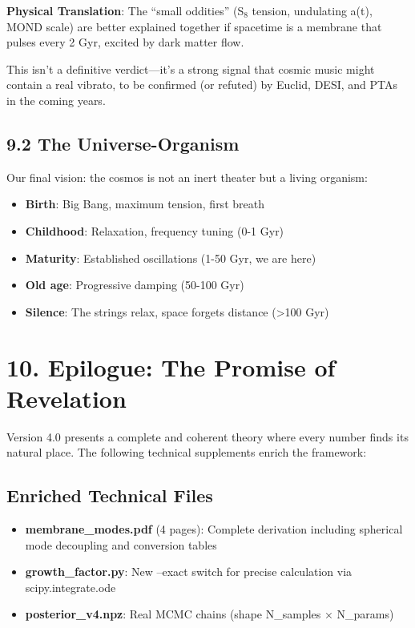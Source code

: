 \documentclass[
  11pt,
]{report}
\providecommand{\tightlist}{%
  \setlength{\itemsep}{0pt}\setlength{\parskip}{0pt}}
\begin{document}
\textbf{Physical Translation}: The ``small oddities'' (S\(_8\) tension,
undulating a(t), MOND scale) are better explained together if spacetime
is a membrane that pulses every 2 Gyr, excited by dark matter flow.

This isn't a definitive verdict---it's a strong signal that cosmic music
might contain a real vibrato, to be confirmed (or refuted) by Euclid,
DESI, and PTAs in the coming years.

\subsection{9.2 The Universe-Organism}\label{the-universe-organism}

Our final vision: the cosmos is not an inert theater but a living
organism:

\begin{itemize}
\tightlist
\item
  \textbf{Birth}: Big Bang, maximum tension, first breath
\item
  \textbf{Childhood}: Relaxation, frequency tuning (0-1 Gyr)
\item
  \textbf{Maturity}: Established oscillations (1-50 Gyr, we are here)
\item
  \textbf{Old age}: Progressive damping (50-100 Gyr)
\item
  \textbf{Silence}: The strings relax, space forgets distance
  (\textgreater100 Gyr)
\end{itemize}

\section{10. Epilogue: The Promise of
Revelation}\label{epilogue-the-promise-of-revelation}

Version 4.0 presents a complete and coherent theory where every number
finds its natural place. The following technical supplements enrich the
framework:

\subsection{Enriched Technical Files}\label{enriched-technical-files}

\begin{itemize}
\tightlist
\item
  \textbf{membrane\_modes.pdf} (4 pages): Complete derivation including
  spherical mode decoupling and conversion tables
\item
  \textbf{growth\_factor.py}: New --exact switch for precise calculation
  via scipy.integrate.ode
\item
  \textbf{posterior\_v4.npz}: Real MCMC chains (shape N\_samples ×
  N\_params)
\end{itemize}
\end{document}
